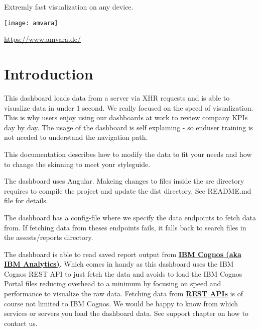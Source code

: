 \documentclass[11pt]{article}
\begin{document}
 
\maketitle %
\thispagestyle{empty}

\begin{centering} %
	Extremly fast visualization on any device.
	\bigskip
	\par
	\bigskip
	\bigskip
	\bigskip
	\bigskip
	\bigskip
	\bigskip
	\bigskip
	\bigskip
	\bigskip
	\bigskip	
	\bigskip
	\bigskip
	\bigskip
	\bigskip
	\bigskip
	\bigskip
	\bigskip
	\bigskip
	\bigskip
	\bigskip
	\texttt{[image: amvara]} \par
	\bigskip
	\url{https://www.amvara.de/} \par
	\bigskip
	\bigskip
	\date{\today}\par %
\end{centering}

\newpage %
\tableofcontents %
\thispagestyle{empty}
\newpage



\section{Introduction} %
This dashboard loads data from a server via XHR requests and is able to visualize data in under 1 second. We really focused on the speed of visualization. This is why users enjoy using our dashboards at work to review company KPIs day by day. The usage of the dashboard is self explaining - so enduser training is not needed to understand the navigation path. 
\bigskip

This documentation describes how to modify the data to fit your needs and how to change the skinning to meet your styleguide.
\bigskip

The dashboard uses Angular. Makeing changes to files inside the src directory requires to compile the project and update the dist directory. See README.md file for details.
\bigskip

The dashboard has a config-file where we specify the data endpoints to fetch data from. If fetching data from theses endpoints fails, it falls back to search files in the assests/reports directory. 
\bigskip

The dashboard is able to read saved report output from \href{https://www.ibm.com/products/cognos-analytics}{\textbf{IBM Cognos (aka IBM Analytics)}}. Which comes in handy as this dashboard uses the IBM Cognos REST API to just fetch the data and avoids to load the IBM Cognos Portal files reducing overhead to a minimum by focusing on speed and performance to visualize the raw data. Fetching data from \href{https://www.ibm.com/support/knowledgecenter/SSEP7J_11.1.0/com.ibm.swg.ba.cognos.ca_api.doc/swagger_ca.json}{\textbf{REST APIs}} is of course not limited to IBM Cognos. We would be happy to know from which services or servers you load the dashboard data. See support chapter on how to contact us.
\end{document}
